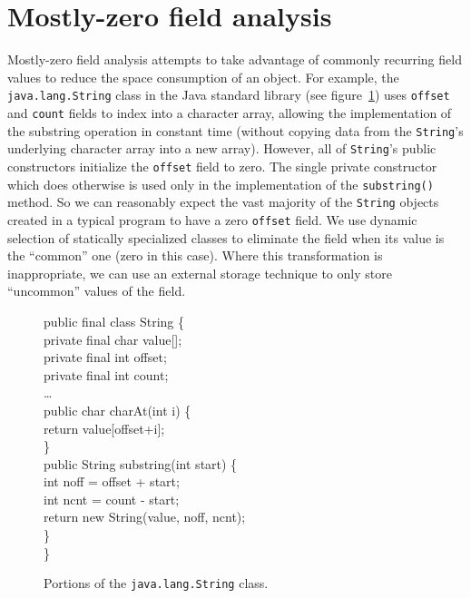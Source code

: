 \documentclass[preprint]{acmconf}
\begin{document}
\section{Mostly-zero field analysis}

Mostly-zero field analysis attempts to take advantage of commonly
recurring field values to reduce the space consumption of an object.
For example, the {\tt java.lang.String} class in the Java standard
library (see figure~\ref{fig:string-fields}) uses {\tt offset} and
{\tt count} fields to index into a character array, allowing the
implementation of the substring operation in constant time (without
copying data from the {\tt String}'s underlying character array into a
new array).  However, all of {\tt String}'s public constructors
initialize the {\tt offset} field to zero.  The single private
constructor which does otherwise is used only in the implementation of
the {\tt substring()} method.  So we can reasonably expect the vast
majority of the {\tt String} objects created in a typical program to
have a zero {\tt offset} field.  We use dynamic selection of
statically specialized classes to eliminate the field when its value
is the ``common'' one (zero in this case).  Where this transformation
is inappropriate, we
can use an external storage technique to only store ``uncommon''
values of the field.
\begin{figure}
\begin{samplecode}
public final class String \{\\
\>private final char value[];\\
\>private final int offset;\\
\>private final int count;\\
\>\ldots\\
\>public char charAt(int i) \{\\
\>\>return value[offset+i];\\
\>\}\\
\>public String substring(int start) \{\\
\>\>int noff = offset + start;\\
\>\>int ncnt = count - start;\\
\>\>return new String(value, noff, ncnt);\\
\>\}\\
\}\\
\end{samplecode}
\caption{Portions of the {\tt java.lang.String} class.}
\label{fig:string-fields}
\end{figure}
\end{document}
